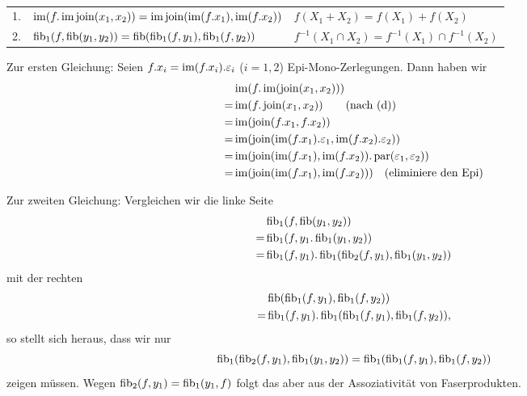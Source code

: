 \begin{lemm}[Regel (f)]
\ \linebreak

\begin{tabular}{rll}
   1.
&  $\im(f.\im\join(x_1,x_2)) = \im\join(\im(f.x_1),\im(f.x_2))$
&  $f(X_1 + X_2) = f(X_1) + f(X_2)$
\\ 2.
&  $\fib_1(f,\fib(y_1,y_2)) = \fib(\fib_1(f,y_1),\fib_1(f,y_2))$
&  $f^{-1}(X_1\cap X_2) = f^{-1}(X_1) \cap f^{-1}(X_2)$
\end{tabular}
\end{lemm}
\begin{bew}
Zur ersten Gleichung: Seien $f.x_i = \im(f.x_i).\varepsilon_i$ ($i=1,2$) Epi-Mono-Zerlegungen.
Dann haben wir
\begin{align*}
   & \im(f.\im(\join(x_1,x_2)))
\\=& \im(f.\join(x_1,x_2)) \qquad \text{(nach (d))}
\\=& \im(\join(f.x_1,f.x_2))
\\=& \im(\join(\im(f.x_1).\varepsilon_1,\im(f.x_2).\varepsilon_2))
\\=& \im(\join(\im(f.x_1),\im(f.x_2)).\para(\varepsilon_1,\varepsilon_2))
\\=& \im(\join(\im(f.x_1),\im(f.x_2))) \quad \text{(eliminiere den Epi)}
\end{align*}

Zur zweiten Gleichung:
Vergleichen wir die linke Seite
\begin{align*}
   & \fib_1(f,\fib(y_1,y_2))
\\=& \fib_1(f,y_1.\fib_1(y_1,y_2))
\\=& \fib_1(f,y_1).\fib_1(\fib_2(f,y_1),\fib_1(y_1,y_2))
\end{align*}
mit der rechten
\begin{align*}
   & \fib(\fib_1(f,y_1),\fib_1(f,y_2))
\\=& \fib_1(f,y_1).\fib_1(\fib_1(f,y_1),\fib_1(f,y_2)),
\end{align*}
so stellt sich heraus, dass wir nur
\[ \fib_1(\fib_2(f,y_1),\fib_1(y_1,y_2)) = \fib_1(\fib_1(f,y_1),\fib_1(f,y_2)) \]
zeigen müssen. Wegen $\fib_2(f,y_1) = \fib_1(y_1,f)$ folgt das aber aus der Assoziativität von Faserprodukten.
\end{bew}


